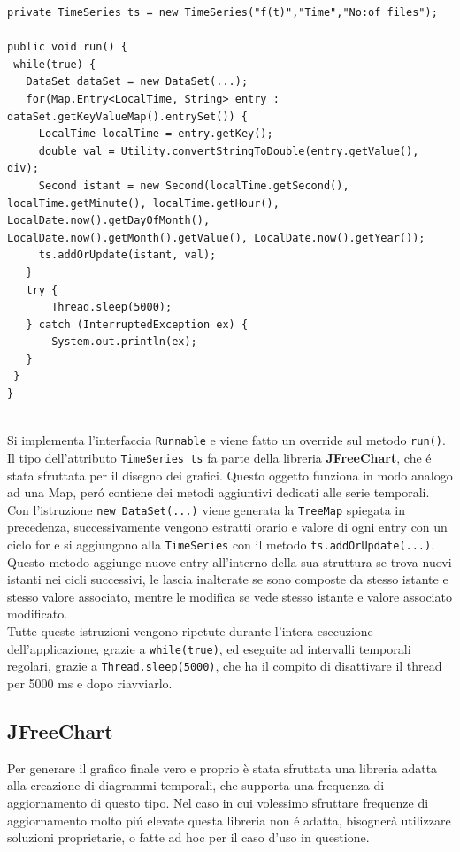 \begin{lstlisting}[autogobble, title={\texttt{DataSetRealTime.java}}]
private TimeSeries ts = new TimeSeries("f(t)","Time","No:of files");

public void run() {
 while(true) {
   DataSet dataSet = new DataSet(...);
   for(Map.Entry<LocalTime, String> entry : dataSet.getKeyValueMap().entrySet()) {
     LocalTime localTime = entry.getKey();
     double val = Utility.convertStringToDouble(entry.getValue(), div);
     Second istant = new Second(localTime.getSecond(), localTime.getMinute(), localTime.getHour(), LocalDate.now().getDayOfMonth(), LocalDate.now().getMonth().getValue(), LocalDate.now().getYear());
     ts.addOrUpdate(istant, val);
   }
   try {
       Thread.sleep(5000);
   } catch (InterruptedException ex) {
       System.out.println(ex);
   }
 }
}
\end{lstlisting}
\\
Si implementa l'interfaccia \texttt{Runnable} e viene fatto un override sul metodo \texttt{run()}.
Il tipo dell'attributo \texttt{TimeSeries ts} fa parte della libreria \textbf{JFreeChart}, che é stata sfruttata per il disegno dei grafici.
Questo oggetto funziona in modo analogo ad una Map, peró contiene dei metodi aggiuntivi dedicati alle serie temporali.\\
Con l'istruzione \texttt{new DataSet(...)} viene generata la \texttt{TreeMap} spiegata in precedenza, successivamente
vengono estratti orario e valore di ogni entry con un ciclo for e si aggiungono alla \texttt{TimeSeries} con
il metodo \texttt{ts.addOrUpdate(...)}.
Questo metodo aggiunge nuove entry all'interno della sua struttura se trova nuovi istanti nei cicli successivi,
le lascia inalterate se sono composte da stesso istante e stesso valore associato, mentre le modifica se vede stesso istante e valore associato
modificato.
\\
Tutte queste istruzioni vengono ripetute durante l'intera esecuzione dell'applicazione, grazie a \texttt{while(true)}, ed eseguite ad intervalli temporali regolari,
grazie a \texttt{Thread.sleep(5000)}, che ha il compito di disattivare il thread per 5000 ms e dopo riavviarlo.


\subsection{JFreeChart}
Per generare il grafico finale vero e proprio è stata sfruttata una libreria adatta alla creazione di diagrammi temporali, che supporta una frequenza di
aggiornamento di questo tipo.
Nel caso in cui volessimo sfruttare frequenze di aggiornamento molto piú elevate questa libreria non é adatta,
bisognerà utilizzare soluzioni proprietarie, o fatte ad hoc per il caso d'uso in questione.

